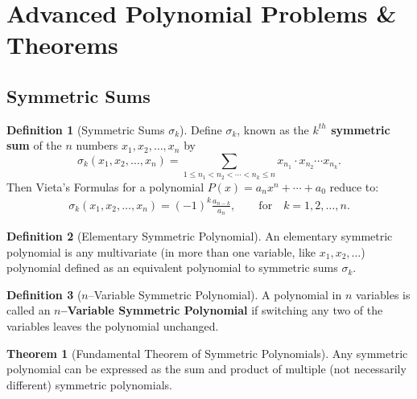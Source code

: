 \documentclass[12pt,a4paper]{memoir}
\theoremstyle{definition}
\newtheorem*{definition}{Definition}
\newtheorem{theorem}{Theorem}
\begin{document}
 \newpage
% 
\section{Advanced Polynomial Problems \& Theorems}

\subsection{Symmetric Sums}

\begin{tcolorbox}[title={Symmetries of Things}]
	\begin{definition}[Symmetric Sums $\sigma_k$]
		Define $\sigma_k$, known as the \textbf{$k^{th}$ symmetric sum} of the $n$ numbers $x_1,x_2,\dots,x_n$ by \[\sigma_k(x_1,x_2,\dots,x_n)= \sum_{1\leq n_1 < n_2 < \cdots < n_k \leq n} x_{n_1} \cdot x_{n_2} \cdots x_{n_k}. \]
		Then Vieta's Formulas for a polynomial $P(x)=a_nx^n+\cdots+a_0$ reduce to:
		\begin{align*}
			\sigma_k(x_1,x_2,\dots,x_n) = (-1)^k \frac{a_{n-k}}{a_n},\qquad \text{for} \quad k=1,2,\dots,n.
		\end{align*}
	\end{definition}
	
	\begin{definition}[Elementary Symmetric Polynomial]
		An elementary symmetric polynomial is any multivariate (in more than one variable, like $x_1, x_2,\dots$) polynomial defined as an equivalent polynomial to symmetric sums $\sigma_k$.
	\end{definition}
	
	\begin{definition}[$n$--Variable Symmetric Polynomial]
		A polynomial in $n$ variables is called an \textbf{$n$--Variable Symmetric Polynomial} if switching any two of the variables leaves the polynomial unchanged.
	\end{definition}
\end{tcolorbox}

\begin{theorem}[Fundamental Theorem of Symmetric Polynomials]
	Any symmetric polynomial can be expressed as the sum and product of multiple (not necessarily different)
	symmetric polynomials.
\end{theorem}



\end{document}
